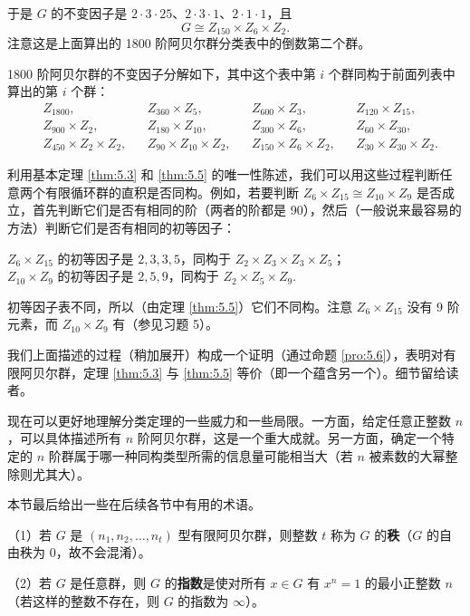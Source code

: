 于是 \(G\) 的不变因子是 \(2 \cdot 3 \cdot 25\)、\(2 \cdot 3 \cdot 1\)、\(2 \cdot 1 \cdot 1\)，且
\[
G \cong Z_{150} \times Z_6 \times Z_2.
\]
注意这是上面算出的 1800 阶阿贝尔群分类表中的倒数第二个群。

1800 阶阿贝尔群的不变因子分解如下，其中这个表中第 \(i\) 个群同构于前面列表中算出的第 \(i\) 个群：
\[
\begin{aligned}
&Z_{1800}, && Z_{360} \times Z_5, && Z_{600} \times Z_3, && Z_{120} \times Z_{15}, \\
&Z_{900} \times Z_2, && Z_{180} \times Z_{10}, && Z_{300} \times Z_6, && Z_{60} \times Z_{30}, \\
&Z_{450} \times Z_2 \times Z_2, && Z_{90} \times Z_{10} \times Z_2, && Z_{150} \times Z_6 \times Z_2, && Z_{30} \times Z_{30} \times Z_2.
\end{aligned}
\]

利用基本定理 \ref{thm:5.3} 和 \ref{thm:5.5} 的唯一性陈述，我们可以用这些过程判断任意两个有限循环群的直积是否同构。例如，若要判断 \(Z_6 \times Z_{15} \cong Z_{10} \times Z_9\) 是否成立，首先判断它们是否有相同的阶（两者的阶都是 90），然后（一般说来最容易的方法）判断它们是否有相同的初等因子：
\begin{center}
\(Z_6 \times Z_{15}\) 的初等因子是 \(2, 3, 3, 5\)，同构于 \(Z_2 \times Z_3 \times Z_3 \times Z_5\)；\\
\(Z_{10} \times Z_9\) 的初等因子是 \(2, 5, 9\)，同构于 \(Z_2 \times Z_5 \times Z_9\).
\end{center}
初等因子表不同，所以（由定理 \ref{thm:5.5}）它们不同构。注意 \(Z_6 \times Z_{15}\) 没有 9 阶元素，而 \(Z_{10} \times Z_9\) 有（参见习题 5）。

我们上面描述的过程（稍加展开）构成一个证明（通过命题 \ref{pro:5.6}），表明对有限阿贝尔群，定理 \ref{thm:5.3} 与 \ref{thm:5.5} 等价（即一个蕴含另一个）。细节留给读者。

现在可以更好地理解分类定理的一些威力和一些局限。一方面，给定任意正整数 \(n\)，可以具体描述所有 \(n\) 阶阿贝尔群，这是一个重大成就。另一方面，确定一个特定的 \(n\) 阶群属于哪一种同构类型所需的信息量可能相当大（若 \(n\) 被素数的大幂整除则尤其大）。

本节最后给出一些在后续各节中有用的术语。

\begin{definition}
（1）若 \(G\) 是 \((n_1, n_2, \ldots, n_t)\) 型有限阿贝尔群，则整数 \(t\) 称为 \(G\) 的\textbf{秩}（\(G\) 的自由秩为 0，故不会混淆）。

（2）若 \(G\) 是任意群，则 \(G\) 的\textbf{指数}是使对所有 \(x \in G\) 有 \(x^n = 1\) 的最小正整数 \(n\)（若这样的整数不存在，则 \(G\) 的指数为 \(\infty\)）。
\end{definition}

